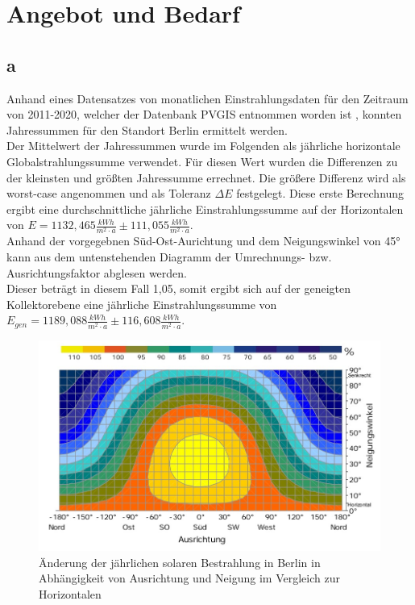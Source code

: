 \section{Angebot und Bedarf}
\label{sec:Angebot und Bedarf}
\subsection{a}
Anhand eines Datensatzes von monatlichen Einstrahlungsdaten für den Zeitraum von 2011-2020, welcher der Datenbank PVGIS entnommen worden ist \cite{PVGIS}, konnten Jahressummen für den Standort Berlin ermittelt werden.\\
Der Mittelwert der Jahressummen wurde im Folgenden als jährliche horizontale Globalstrahlungssumme verwendet.
Für diesen Wert wurden die Differenzen zu der kleinsten und größten Jahressumme errechnet.
Die größere Differenz wird als worst-case angenommen und als Toleranz $\Delta E$ festgelegt.
Diese erste Berechnung ergibt eine durchschnittliche jährliche Einstrahlungssumme
auf der Horizontalen von $E = 1132,465 \frac{kWh}{m^2\cdot a} \pm 111,055 \frac{kWh}{m^2\cdot a}$.\\
Anhand der vorgegebnen Süd-Ost-Aurichtung und dem Neigungswinkel von 45° kann aus dem untenstehenden Diagramm der Umrechnungs- bzw. Ausrichtungsfaktor abglesen werden.\\
Dieser beträgt in diesem Fall 1,05, somit ergibt sich auf der geneigten Kollektorebene eine jährliche Einstrahlungssumme von
$E_{gen} = 1189,088 \frac{kWh}{m^2\cdot a} \pm 116,608 \frac{kWh}{m^2\cdot a}$.

\begin{figure}[H]
  \centering
  \includegraphics[width=\textwidth]{Abbildungen/Ausrichtung.jpg}
  \caption{Änderung der jährlichen solaren Bestrahlung in Berlin in Abhängigkeit von Ausrichtung
  und Neigung im Vergleich zur Horizontalen \cite[S.92]{QUA19}}
  \label{fig:Ausrichtungsfaktor}
\end{figure}